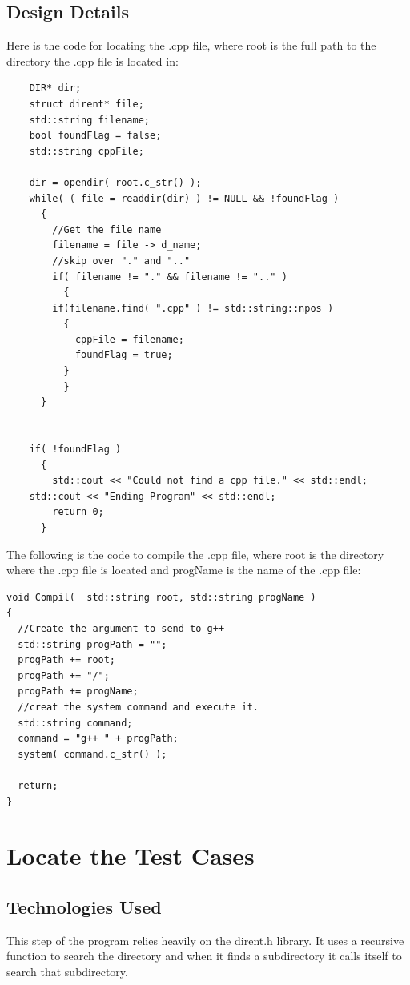 \subsection{Design Details}
Here is the code for locating the .cpp file, where root is the full path to the directory the .cpp file is located in:
\begin{lstlisting}
    DIR* dir;
    struct dirent* file;
    std::string filename;
    bool foundFlag = false;
    std::string cppFile;

    dir = opendir( root.c_str() );
    while( ( file = readdir(dir) ) != NULL && !foundFlag )
      {
        //Get the file name
        filename = file -> d_name;
        //skip over "." and ".."
        if( filename != "." && filename != ".." )
          {
        if(filename.find( ".cpp" ) != std::string::npos )
          {
            cppFile = filename;
            foundFlag = true;
          }
          }
      }


    if( !foundFlag )
      {
        std::cout << "Could not find a cpp file." << std::endl;
	std::cout << "Ending Program" << std::endl;
        return 0;
      }
\end{lstlisting}

The following is the code to compile the .cpp file, where root is the directory where the .cpp file is located
and progName is the name of the .cpp file:
\begin{lstlisting}
void Compil(  std::string root, std::string progName )
{
  //Create the argument to send to g++
  std::string progPath = "";
  progPath += root;
  progPath += "/";
  progPath += progName;
  //creat the system command and execute it.
  std::string command;
  command = "g++ " + progPath;
  system( command.c_str() );
 
  return;
}
\end{lstlisting}



\section{Locate the Test Cases }

\subsection{Technologies  Used}
This step of the program relies heavily on the dirent.h library.  It uses a recursive function to search the directory and when
it finds a subdirectory it calls itself to search that subdirectory.


